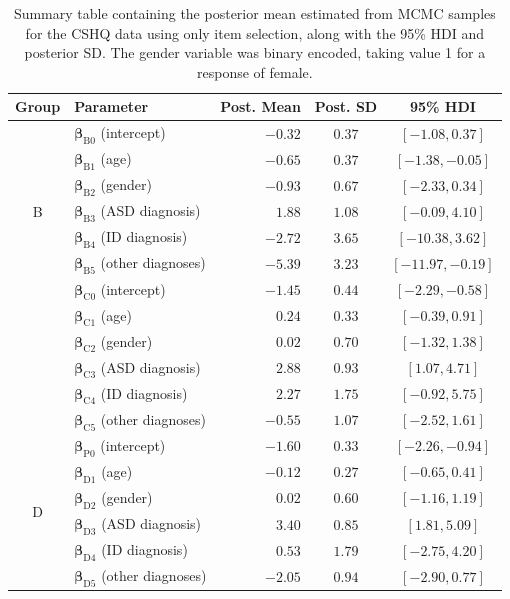 \documentclass[11pt]{article}
\def\bsbet{\boldsymbol{\beta}}
\theoremstyle{plain}
\theoremstyle{definition}
\begin{document}
\begin{table}[H]
\centering
\begin{tabular}{clrcc}
\hline
\textbf{Group} & \textbf{Parameter} & \textbf{Post. Mean} & \textbf{Post. SD} & \textbf{95\% HDI}  \\
\hline
\multirow{7}{*}{B} & $\bsbet_{\text{B}0}$ (intercept) & $-0.32$  & $0.37$ & $[-1.08, 0.37]$   \\
&$\bsbet_{\text{B}1}$ (age) & $-0.65$ & $0.37$ & $[-1.38, -0.05]$     \\
&$\bsbet_{\text{B}2}$ (gender) & $-0.93$  & $0.67$ & $[-2.33, 0.34]$      \\
&$\bsbet_{\text{B}3}$ (ASD diagnosis) & $1.88$ & $1.08$ &  $[-0.09, 4.10]$     \\
&$\bsbet_{\text{B}4}$ (ID diagnosis) & $-2.72$ & $3.65$ &  $[-10.38, 3.62] $    \\
&$\bsbet_{\text{B}5}$ (other diagnoses) & $-5.39$ & $3.23$ &  $[-11.97, -0.19]$     \\
\hline
\multirow{7}{*}{C} &$\bsbet_{\text{C}0}$ (intercept) &  $-1.45$ & $0.44$ &  $[-2.29, -0.58]$  \\
&$\bsbet_{\text{C}1}$ (age) & $0.24$ & $0.33$ &  $[-0.39, 0.91]$    \\
&$\bsbet_{\text{C}2}$ (gender) & $0.02$ & $0.70$ & $[-1.32, 1.38]$     \\
&$\bsbet_{\text{C}3}$ (ASD diagnosis) & $2.88$ & $0.93$ &  $[1.07, 4.71]$     \\
&$\bsbet_{\text{C}4}$ (ID diagnosis) & $2.27$ & $1.75$ &  $[-0.92, 5.75]$    \\
&$\bsbet_{\text{C}5}$ (other diagnoses) & $-0.55$ & $1.07$ &  $[-2.52, 1.61]$    \\
\hline
\multirow{7}{*}{D} &$\bsbet_{\text{P}0}$ (intercept) & $-1.60$ & $0.33$ & $[-2.26, -0.94] $  \\
&$\bsbet_{\text{D}1}$ (age) & $-0.12$ & $0.27$ & $[-0.65, 0.41]$     \\
&$\bsbet_{\text{D}2}$ (gender) & $0.02$ & $0.60$ &  $[-1.16, 1.19]$    \\
&$\bsbet_{\text{D}3}$ (ASD diagnosis) & $3.40$ & $0.85$ & $[1.81, 5.09]$     \\
&$\bsbet_{\text{D}4}$ (ID diagnosis) & $0.53$ & $1.79$ &   $[-2.75, 4.20]$   \\
&$\bsbet_{\text{D}5}$ (other diagnoses) & $-2.05$ & $0.94$ &   $[-2.90, 0.77]$    \\
\hline
\end{tabular}
\caption{Summary table containing the posterior mean estimated from MCMC samples for the CSHQ data using only item selection, along with the 95\% HDI and posterior SD. The gender variable was binary encoded, taking value 1 for a response of female.}\label{table:CSHQ_beta_estimates}
\end{table}
\end{document}
